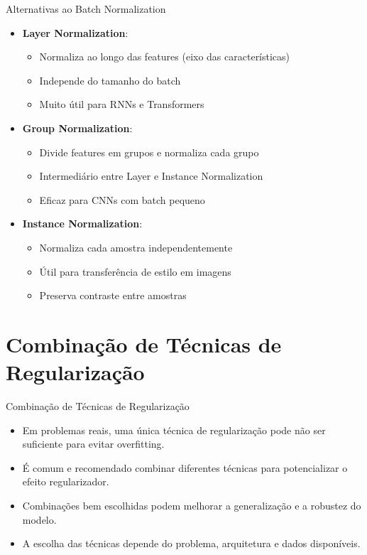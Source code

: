 \documentclass{beamer}
\begin{document}
\begin{frame}{Alternativas ao Batch Normalization}
\begin{itemize}
    \item \textbf{Layer Normalization}: 
    \begin{itemize}
        \item Normaliza ao longo das features (eixo das características)
        \item Independe do tamanho do batch
        \item Muito útil para RNNs e Transformers
    \end{itemize}
    
    \item \textbf{Group Normalization}: 
    \begin{itemize}
        \item Divide features em grupos e normaliza cada grupo
        \item Intermediário entre Layer e Instance Normalization
        \item Eficaz para CNNs com batch pequeno
    \end{itemize}
    
    \item \textbf{Instance Normalization}: 
    \begin{itemize}
        \item Normaliza cada amostra independentemente
        \item Útil para transferência de estilo em imagens
        \item Preserva contraste entre amostras
    \end{itemize}
\end{itemize}
\end{frame}

\section{Combinação de Técnicas de Regularização}
\begin{frame}{Combinação de Técnicas de Regularização}
\begin{itemize}
  \item Em problemas reais, uma única técnica de regularização pode não ser suficiente para evitar overfitting.
  \item É comum e recomendado combinar diferentes técnicas para potencializar o efeito regularizador.
  \item Combinações bem escolhidas podem melhorar a generalização e a robustez do modelo.
  \item A escolha das técnicas depende do problema, arquitetura e dados disponíveis.
\end{itemize}
\end{frame}
\end{document}
